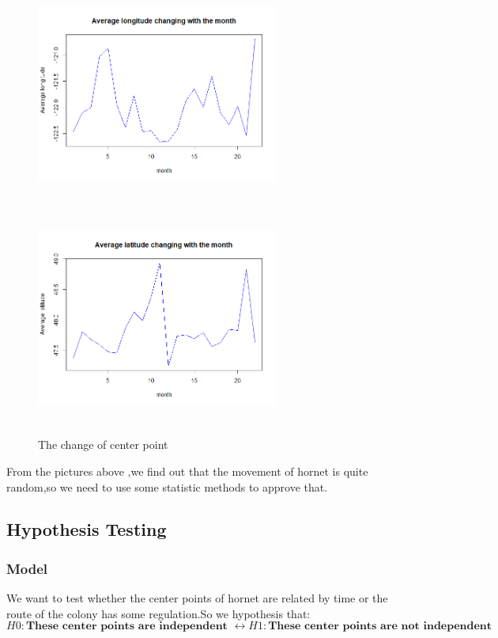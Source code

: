 \documentclass[12pt]{article}
\begin{document}
\begin{figure}[H]
	\small
	\centering
	\begin{minipage}{8cm}
		\includegraphics[width=8cm,height=7cm]{./pictures/longtitude.png}
		\label{nt}
	\end{minipage}
	\begin{minipage}{8cm}
		\includegraphics[width=8cm,height=7cm]{./pictures/latitude.png}
		\label{nt}
	\end{minipage}
	\caption{The change of center point}
\end{figure}
From the pictures above ,we find out that the movement of hornet is quite random,so we need to use some statistic methods to approve that.

\subsection{Hypothesis Testing}
\subsubsection{Model}
We want to test whether the center points of hornet are related by time or the route of the colony has some regulation.So we hypothesis that:
\begin{equation*}
H0:\textbf{These center points are independent }\leftrightarrow H1:\textbf{These center points are not independent}
\end{equation*}
\end{document}
